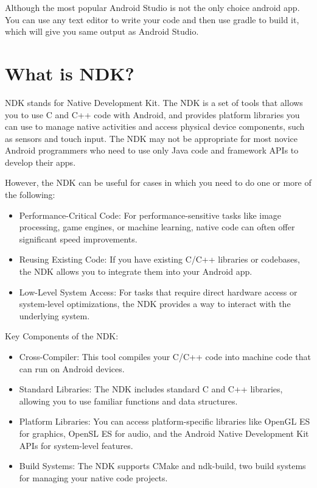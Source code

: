 \documentclass[12pt,oneside]{book}
\begin{document}
Although the most popular Android Studio is not the only choice android app. You can use any text editor to write your code and then use gradle to build it, which will give you same output as Android Studio.

\section{What is NDK?}
NDK stands for Native Development Kit. The NDK is a set of tools that allows you to use C and C++ code with Android, and provides platform libraries you can use to manage native activities and access physical device components, such as sensors and touch input. The NDK may not be appropriate for most novice Android programmers who need to use only Java code and framework APIs to develop their apps.

However, the NDK can be useful for cases in which you need to do one or more of the following:
\begin{itemize}
  \item Performance-Critical Code: For performance-sensitive tasks like image processing, game engines, or machine learning, native code can often offer significant speed improvements.
  \item Reusing Existing Code: If you have existing C/C++ libraries or codebases, the NDK allows you to integrate them into your Android app.
  \item Low-Level System Access: For tasks that require direct hardware access or system-level optimizations, the NDK provides a way to interact with the underlying system.
\end{itemize}

Key Components of the NDK:
\begin{itemize}
  \item Cross-Compiler: This tool compiles your C/C++ code into machine code that can run on Android devices.
  \item Standard Libraries: The NDK includes standard C and C++ libraries, allowing you to use familiar functions and data structures.
  \item Platform Libraries: You can access platform-specific libraries like OpenGL ES for graphics, OpenSL ES for audio, and the Android Native Development Kit APIs for system-level features.
  \item Build Systems: The NDK supports CMake and ndk-build, two build systems for managing your native code projects.
\end{itemize}
\end{document}
